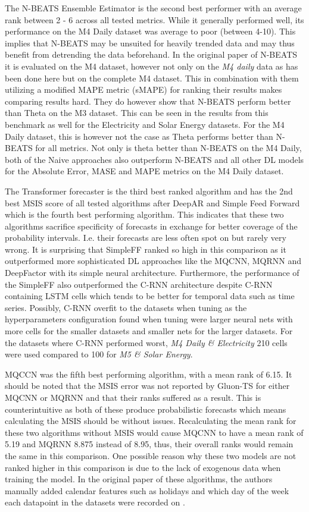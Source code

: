 The N-BEATS Ensemble Estimator is the second best performer with an average rank between 2 - 6 across all tested metrics. While it generally performed well, its performance on the M4 Daily dataset was average to poor (between 4-10). This implies that N-BEATS may be unsuited for heavily trended data and may thus benefit from detrending the data beforehand. In the original paper of N-BEATS it is evaluated on the M4 dataset, however not only on the \textit{M4 daily} data as has been done here but on the complete M4 dataset. This in combination with them utilizing a modified MAPE metric (sMAPE) for ranking their results makes comparing results hard. They do however show that N-BEATS perform better than Theta on the M3 dataset. This can be seen in the results from this benchmark as well for the Electricity and Solar Energy datasets. For the M4 Daily dataset, this is however not the case as Theta performs better than N-BEATS for all metrics. Not only is theta better than N-BEATS on the M4 Daily, both of the Naive approaches also outperform N-BEATS and all other DL models for the Absolute Error, MASE and MAPE metrics on the M4 Daily dataset.

The Transformer forecaster is the third best ranked algorithm and has the 2nd best MSIS score of all tested algorithms after DeepAR and Simple Feed Forward which is the fourth best performing algorithm. This indicates that these two algorithms sacrifice specificity of forecasts in exchange for better coverage of the probability intervals. I.e. their forecasts are less often spot on but rarely very wrong. It is surprising that SimpleFF ranked so high in this comparison as it outperformed more sophisticated DL approaches like the MQCNN, MQRNN and DeepFactor with its simple neural architecture. Furthermore, the performance of the SimpleFF also outperformed the C-RNN architecture despite C-RNN containing LSTM cells which tends to be better for temporal data such as time series. Possibly, C-RNN overfit to the datasets when tuning as the hyperparameters configuration found when tuning were larger neural nets with more cells for the smaller datasets and smaller nets for the larger datasets. For the datasets where C-RNN performed worst, \textit{M4 Daily \& Electricity} 210 cells were used compared to 100 for \textit{M5 \& Solar Energy}.

MQCCN was the fifth best performing algorithm, with a mean rank of 6.15. It should be noted that the MSIS error was not reported by Gluon-TS for either MQCNN or MQRNN and that their ranks suffered as a result. This is counterintuitive as both of these produce probabilistic forecasts which means calculating the MSIS should be without issues. Recalculating the mean rank for these two algorithms without MSIS would cause MQCNN to have a mean rank of 5.19 and MQRNN 8.875 instead of 8.95, thus, their overall ranks would remain the same in this comparison. One possible reason why these two models are not ranked higher in this comparison is due to the lack of exogenous data when training the model. In the original paper of these algorithms, the authors manually added calendar features such as holidays and which day of the week each datapoint in the datasets were recorded on \cite{wen_multi-horizon_2018}.

